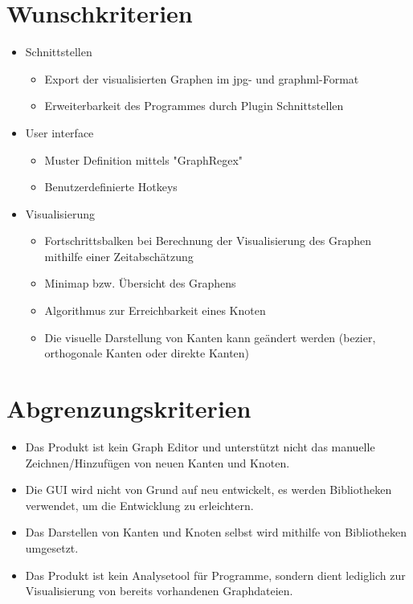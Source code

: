 \section{Wunschkriterien}

\begin{itemize}
\item Schnittstellen
\begin{itemize}
\item Export der visualisierten Graphen im \gls{jpg}- und \gls{graphml}-Format
\item Erweiterbarkeit des Programmes durch Plugin Schnittstellen
\end{itemize}
\item User interface
\begin{itemize}
\item Muster Definition mittels "GraphRegex"
\item Benutzerdefinierte Hotkeys
\end{itemize}
\item Visualisierung
\begin{itemize}
\item Fortschrittsbalken bei Berechnung der Visualisierung des Graphen mithilfe einer Zeitabschätzung
\item Minimap bzw. Übersicht des Graphens
\item Algorithmus zur Erreichbarkeit eines Knoten
\item Die visuelle Darstellung von Kanten kann geändert werden (\gls{bezier}, orthogonale Kanten oder direkte Kanten)
\end{itemize}
\end{itemize}

\section{Abgrenzungskriterien}

\begin{itemize}
\item Das Produkt ist kein Graph Editor und unterstützt nicht das manuelle Zeichnen/Hinzufügen von neuen Kanten und Knoten.
\item Die GUI wird nicht von Grund auf neu entwickelt, es werden Bibliotheken verwendet, um die Entwicklung zu erleichtern.
\item Das Darstellen von Kanten und Knoten selbst wird mithilfe von Bibliotheken umgesetzt.
\item Das Produkt ist kein Analysetool für Programme, sondern dient lediglich zur Visualisierung von bereits vorhandenen Graphdateien.
\end{itemize}
